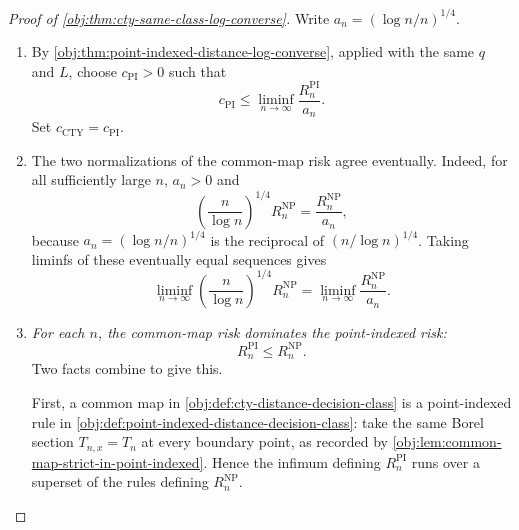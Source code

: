 \documentclass[11pt]{article}
\begin{document}
\begin{proof}[Proof of \cref{obj:thm:cty-same-class-log-converse}]
Write \(a_n=(\log n/n)^{1/4}\).
\begin{enumerate}
\item By \cref{obj:thm:point-indexed-distance-log-converse}, applied with the same \(q\) and \(L\), choose \(c_{\mathrm{PI}}>0\) such that
\[
c_{\mathrm{PI}}
\leq
\liminf_{n\to\infty}\frac{R_n^{\mathrm{PI}}}{a_n}.
\]
Set \(c_{\mathrm{CTY}}=c_{\mathrm{PI}}\).

\item The two normalizations of the common-map risk agree eventually. Indeed, for all sufficiently large \(n\), \(a_n>0\) and
\[
\left(\frac{n}{\log n}\right)^{1/4}R_n^{\mathrm{NP}}
=
\frac{R_n^{\mathrm{NP}}}{a_n},
\]
because \(a_n=(\log n/n)^{1/4}\) is the reciprocal of \((n/\log n)^{1/4}\).  Taking liminfs of these eventually equal sequences gives
\[
\liminf_{n\to\infty}
\left(\frac{n}{\log n}\right)^{1/4}R_n^{\mathrm{NP}}
=
\liminf_{n\to\infty}\frac{R_n^{\mathrm{NP}}}{a_n}.
\]

\item \emph{For each \(n\), the common-map risk dominates the point-indexed risk:}
\[
R_n^{\mathrm{PI}}\leq R_n^{\mathrm{NP}}.
\]
Two facts combine to give this.

First, a common map in \cref{obj:def:cty-distance-decision-class} is a point-indexed rule in \cref{obj:def:point-indexed-distance-decision-class}: take the same Borel section \(T_{n,x}=T_n\) at every boundary point, as recorded by \cref{obj:lem:common-map-strict-in-point-indexed}.  Hence the infimum defining \(R_n^{\mathrm{PI}}\) runs over a superset of the rules defining \(R_n^{\mathrm{NP}}\).


\end{enumerate}
\end{proof}
\end{document}
